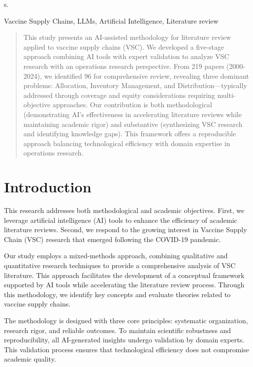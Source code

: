 \documentclass[journal,onecolumn]{IEEEtran}
\begin{document}
s.
\begin{IEEEkeywords}
Vaccine Supply Chains, LLMs, Artificial Intelligence, Literature review
\end{IEEEkeywords}

\begin{abstract}
    This study presents an AI-assisted methodology for literature review applied to vaccine supply chains (VSC). We developed a five-stage approach combining AI tools with expert validation to analyze VSC research with an operations research perspective. From 219 papers (2000-2024), we identified 96 for comprehensive review, revealing three dominant problems: Allocation, Inventory Management, and Distribution—typically addressed through coverage and equity considerations requiring multi-objective approaches. Our contribution is both methodological (demonstrating AI's effectiveness in accelerating literature reviews while maintaining academic rigor) and substantive (synthesizing VSC research and identifying knowledge gaps). This framework offers a reproducible approach balancing technological efficiency with domain expertise in operations research.
\end{abstract}


\section{Introduction}

This research addresses both methodological and academic objectives. First, we leverage artificial intelligence (AI) tools to enhance the efficiency of academic literature reviews. Second, we respond to the growing interest in Vaccine Supply Chain (VSC) research that emerged following the COVID-19 pandemic.

Our study employs a mixed-methods approach, combining qualitative and quantitative research techniques to provide a comprehensive analysis of VSC literature. This approach facilitates the development of a conceptual framework supported by AI tools while accelerating the literature review process. Through this methodology, we identify key concepts and evaluate theories related to vaccine supply chains.

The methodology is designed with three core principles: systematic organization, research rigor, and reliable outcomes. To maintain scientific robustness and reproducibility, all AI-generated insights undergo validation by domain experts. This validation process ensures that technological efficiency does not compromise academic quality.
\end{document}
